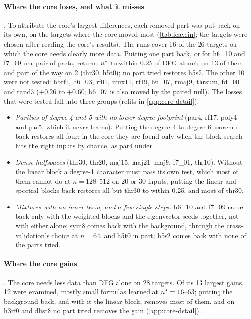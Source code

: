 \paragraph{Where the core loses, and what it misses} . To attribute the core's largest differences, each removed part was put back on its own, on the targets where the core moved most (\cref{tab:leavein}; the targets were chosen after reading the core's results). The runs cover 16 of the 26 targets on which the core needs clearly more data. Putting one part back, or for h6\_10 and f7\_09 one pair of parts, returns $n^{*}$ to within 0.25 of DFG alone's on 13 of them and part of the way on 2 (thr30, h5t0); no part tried restores h5s2. The other 10 were not tested: h5rf1, h6\_03, rf01, mux11, rf19, h6\_07, rmaj9, thrsum, fd\_00 and rand3 ($+0.26$ to $+0.60$; h6\_07 is also moved by the paired null). The losses that were tested fall into three groups (refits in \cref{app:core-detail}).
\begin{itemize}
\item \emph{Parities of degree 4 and 5 with no lower-degree footprint} (par4, rf17, poly4 and par5, which it never learns). Putting the degree-4 to degree-6 searches back restores all four; in the core they are found only when the block search hits the right inputs by chance, as par4 under .
\item \emph{Dense halfspaces} (thr30, thr20, maj15, maj21, maj9, f7\_01, thr10). Without the linear block a degree-1 character must pass its own test, which most of them cannot do at $n=128$--512 on 20 or 30 inputs; putting the linear and spectral blocks back restores all but thr30 to within 0.25, and most of thr30.
\item \emph{Mixtures with an inner term, and a few single steps.} h6\_10 and f7\_09 come back only with the weighted blocks and the eigenvector seeds together, not with either alone; sym8 comes back with the background, through the cross-validation's choice at $n=64$, and h5t0 in part; h5s2 comes back with none of the parts tried.
\end{itemize}

\paragraph{Where the core gains} . The core needs less data than DFG alone on 28 targets. Of its 13 largest gains, 12 were examined, mostly small formulas learned at $n^{*}=16$--63; putting the background back, and with it the linear block, removes most of them, and on h3rf0 and dlist8 no part tried removes the gain (\cref{app:core-detail}).

